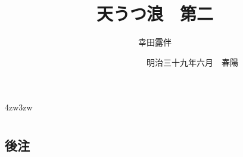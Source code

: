 \documentclass[
uplatex                                     ,%
dvipdfmx                                    ,%
book                                        ,%
tate                                        ,%
twoside                                     ,%
paper                       = a5paper       ,%
open_bracket_pos            = nibu_tentsuki ,%
hanging_punctuation                         ,%
openany                                     ,%
jafontsize                  = 12pt          ,%
]{jlreq}
\title{\Huge 天うつ浪　{\Large 第二}}
\author{幸田露伴}
\date{　　　　　　　　　{\small 明治三十九年六月}　春陽{\換字{堂}}}
\begin{document}
\maketitle
\pagestyle{myheadings}
\newcommand{\Entry}[1]{
	\section*{#1}
	\markboth{#1}{#1}
	\setcounter{equation}{0}}
\begin{indentation}{4zw}{3zw}
\parindent=0pt

\chapter*{}





















































\newpage
\section*{後注}
\theendnotes

\end{indentation}
\end{document}
